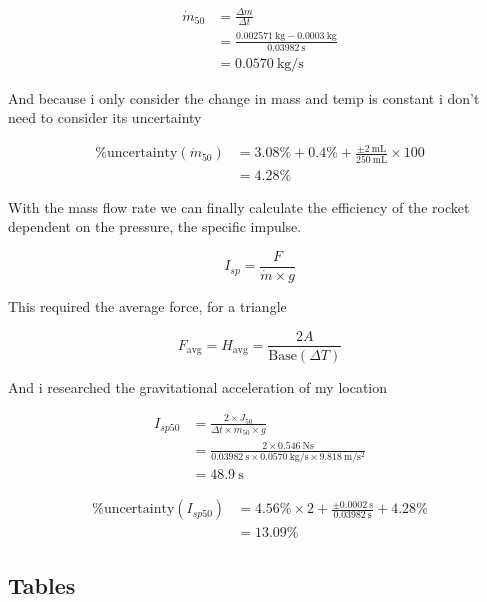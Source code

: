 \documentclass[12pt,a4paper]{article}
\begin{document}
\begin{align}
\dot{m}_{50} &= \frac{\Delta m}{\Delta t} \\
&= \frac{\SI{0.002571}{\kilo\gram} - \SI{0.0003}{\kilo\gram}}{\SI{0.03982}{\second}} \\
&= \SI{0.0570}{\kilo\gram\per\second}
\end{align}

And because i only consider the change in mass and temp is constant i don't need to consider its uncertainty

\begin{align}
\%\text{uncertainty}(\dot{m}_{50}) &= 3.08\% + 0.4\% + \frac{\pm \SI{2}{\milli\liter}}{\SI{250}{\milli\liter}} \times 100 \\
&= 4.28\%
\end{align}

With the mass flow rate we can finally calculate the efficiency of the rocket dependent on the pressure, the specific impulse.

\begin{equation}
I_{sp} = \frac{F}{\dot{m} \times g}
\end{equation}

This required the average force, for a triangle

\begin{equation}
F_{\text{avg}} = H_{\text{avg}} = \frac{2A}{\text{Base}(\Delta T)}
\end{equation}

And i researched the gravitational acceleration of my location

\begin{align}
I_{sp50} &= \frac{2 \times J_{50}}{\Delta t \times \dot{m}_{50} \times g} \\
&= \frac{2 \times \SI{0.546}{\newton\second}}{\SI{0.03982}{\second} \times \SI{0.0570}{\kilo\gram\per\second} \times \SI{9.818}{\meter\per\second\squared}} \\
&= \SI{48.9}{\second}
\end{align}

\begin{align}
\%\text{uncertainty}(I_{sp50}) &= 4.56\% \times 2 + \frac{\pm \SI{0.0002}{\second}}{\SI{0.03982}{\second}} + 4.28\% \\
&= 13.09\%
\end{align}

\subsection{Tables}
\end{document}
